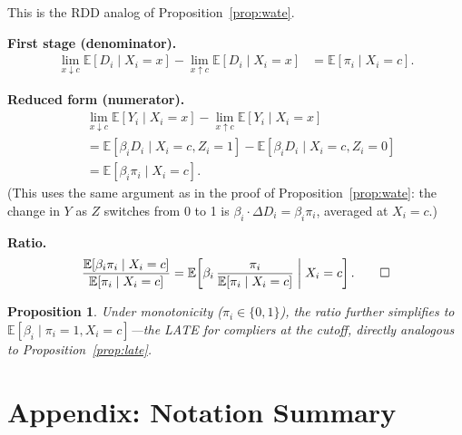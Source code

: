 \documentclass[12pt,a4paper]{article}
\theoremstyle{plain}
\newtheorem{propositio}{Proposition}[section]
\theoremstyle{definition}
\renewenvironment{proof}{\pushQED{\qed}\normalfont}{\popQED\par\nobreak}
\newcommand{\E}{\mathbb{E}}
\begin{document}
\begin{proof}
This is the RDD analog of Proposition~\ref{prop:wate}.

\textbf{First stage (denominator).}
\begin{align*}
  \lim_{x\downarrow c}\E[D_i\mid X_i=x]-\lim_{x\uparrow c}\E[D_i\mid X_i=x]
  &= \E[\pi_i\mid X_i=c].
\end{align*}

\textbf{Reduced form (numerator).}
\begin{align*}
  &\lim_{x\downarrow c}\E[Y_i\mid X_i=x]-\lim_{x\uparrow c}\E[Y_i\mid X_i=x]\\
  &= \E[\beta_i D_i\mid X_i=c,Z_i=1]-\E[\beta_i D_i\mid X_i=c,Z_i=0]\\
  &= \E[\beta_i\pi_i\mid X_i=c].
\end{align*}
(This uses the same argument as in the proof of Proposition~\ref{prop:wate}: the change in $Y$ as $Z$ switches from 0 to 1 is $\beta_i\cdot\Delta D_i = \beta_i\pi_i$, averaged at $X_i=c$.)

\textbf{Ratio.}
\[
  \frac{\E[\beta_i\pi_i\mid X_i=c]}{\E[\pi_i\mid X_i=c]}
  = \E\!\left[\beta_i\,\frac{\pi_i}{\E[\pi_i\mid X_i=c]}\biggm| X_i=c\right]. \qedhere
\]
\end{proof}

\begin{propositio}
  Under monotonicity ($\pi_i\in\{0,1\}$), the ratio further simplifies to $\E[\beta_i\mid\pi_i=1,X_i=c]$—the LATE for compliers at the cutoff, directly analogous to Proposition~\ref{prop:late}.
\end{propositio}

\newpage
\appendix
\section*{Appendix: Notation Summary}

\vspace{-10pt}
\end{document}
